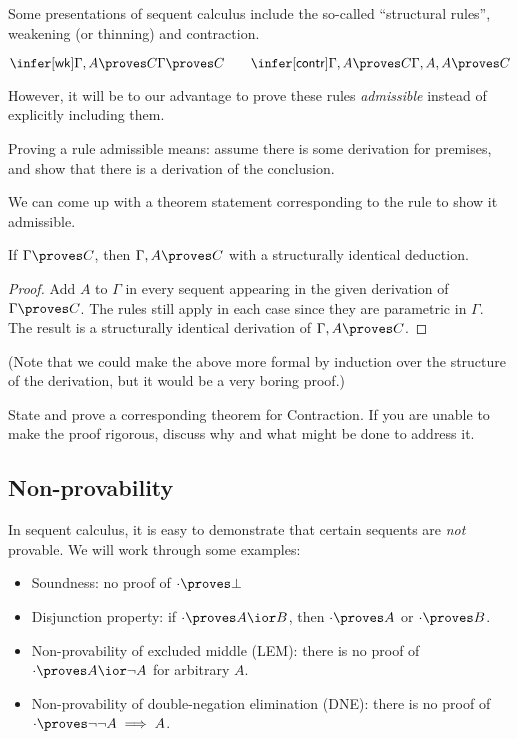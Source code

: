 \documentclass{article}
\begin{document}
Some presentations of sequent calculus include
the so-called ``structural rules'', weakening (or thinning) 
and contraction.

\[
  \infer[\mathsf{wk}]
  {\Gamma, A \proves C}
  {\Gamma \proves C}
  \qquad
  \infer[\mathsf{contr}]
  {\Gamma, A \proves C}
  {\Gamma, A, A \proves C}
\]

However, it will be to our advantage to prove these rules {\em admissible}
instead of explicitly including them.

Proving a rule admissible means: assume there is some derivation for
premises, and show that there is a derivation of the conclusion.

We can come up with a theorem statement corresponding to the rule to show
it admissible.

\begin{theorem}[Weakening]
  If $\Gamma \proves C$, then $\Gamma, A \proves C$ with
  a structurally identical deduction.
\end{theorem}

\begin{proof}
  Add $A$ to $\Gamma$ in every sequent appearing in 
  the given derivation of $\Gamma \proves C$. The rules still apply in each
  case since they are parametric in $\Gamma$. 
  The result is a structurally identical derivation
  of $\Gamma, A \proves C$.
\end{proof}

(Note that we could make the above more formal by induction over the
structure of the derivation, but it would be a very boring proof.)

\begin{exercise} 
  State and prove a corresponding theorem for Contraction.
  If you are unable to make the proof rigorous,
  discuss why and what might be done to address it.
\end{exercise}

\subsection{Non-provability}

In sequent calculus, it is easy to demonstrate
that certain sequents are {\em not} provable.
We will work through some examples:

\begin{itemize}
  \item Soundness: no proof of $\cdot \proves \bot$
  \item Disjunction property: if $\cdot \proves A \ior B$,
    then $\cdot \proves A$ or $\cdot \proves B$.
  \item Non-provability of excluded middle (LEM): there is no proof
    of $\cdot \proves A \ior \lnot A$ for arbitrary $A$.
  \item Non-provability of double-negation elimination (DNE):
    there is no proof of $\cdot \proves \lnot \lnot A \implies A$.
\end{itemize}
\end{document}
